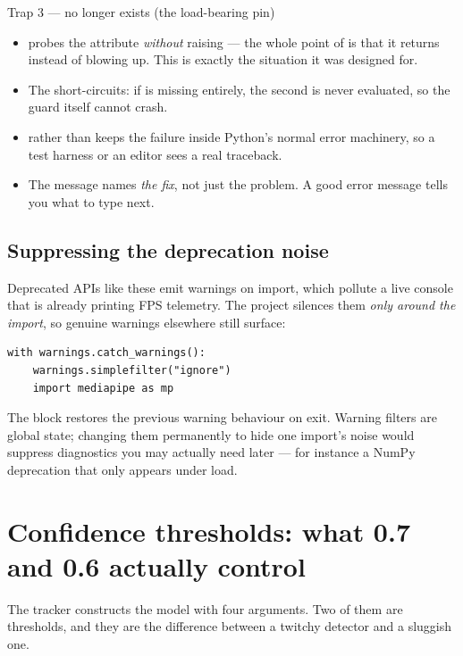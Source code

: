 \begin{edgetrap}{Trap 3 ---  no longer exists (the load-bearing pin)}
\begin{itemize}
  \item {} probes the attribute \emph{without} raising --- the whole
        point of  is that it returns  instead of blowing up. This is
        exactly the situation it was designed for.
  \item The  short-circuits: if  is missing entirely, the second
         is never evaluated, so the guard itself cannot crash.
  \item {} rather than  keeps the failure inside Python's
        normal error machinery, so a test harness or an editor sees a real traceback.
  \item The message names \emph{the fix}, not just the problem. A good error message tells you what
        to type next.
\end{itemize}
\end{edgetrap}

\subsection{Suppressing the deprecation noise}

Deprecated APIs like these emit warnings on import, which pollute a live console that is already
printing FPS telemetry. The project silences them \emph{only around the import}, so genuine warnings
elsewhere still surface:

\begin{codecard}
\begin{lstlisting}
with warnings.catch_warnings():
    warnings.simplefilter("ignore")
    import mediapipe as mp
\end{lstlisting}
\end{codecard}

The  block restores the previous warning behaviour on exit. Warning filters are global
state; changing them permanently to hide one import's noise would suppress diagnostics you may
actually need later --- for instance a NumPy deprecation that only appears under load.

\section{Confidence thresholds: what 0.7 and 0.6 actually control}

The tracker constructs the model with four arguments. Two of them are thresholds, and they are the
difference between a twitchy detector and a sluggish one.


